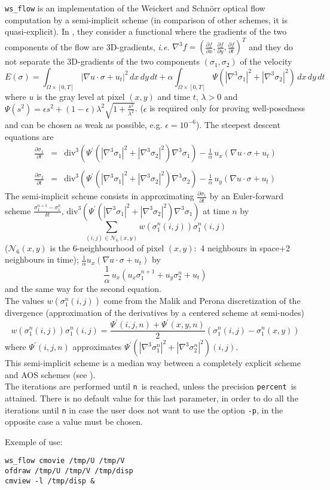 \verb+ws_flow+ is an implementation of the Weickert and Schn\"orr optical flow computation by a semi-implicit scheme (in comparison of other schemes, it is quasi-explicit). In \cite{weickert.schnorr:of}, they consider a functional where the gradients of the two components of the flow are 3D-gradients, \emph{i.e.} $\nabla^{3} f=(\frac{\partial f}{\partial x},\frac{\partial f}{\partial y},\frac{\partial f}{\partial t})^{T}$ and they do not separate the 3D-gradients of the two components $(\sigma_{1},\sigma_{2})$ of the velocity
$$E(\sigma)=\int_{\Omega\times[0,T]}|\nabla u\cdot \sigma+u_{t}|^2\,dx\,dy\,dt+\alpha \int_{\Omega\times[0,T]} \Psi(|\nabla^{3}\sigma_{1}|^2+|\nabla^{3}\sigma_{2}|^2)\,dx\,dy\,dt$$
where $u$ is the gray level at pixel $(x,y)$ and time $t$, $\lambda>0$ and $\Psi(s^2)=\epsilon s^2+(1-\epsilon)\lambda^2\sqrt{1+\frac{s^2}{\lambda^2}}$. ($\epsilon$ is required only for proving well-posedness and can be chosen as weak as possible, e.g. $\epsilon=10^{-6}$). 
The steepest descent equations are
$$\begin{array}{rcl}
\frac{\partial \sigma_{1}}{\partial t} & = & \mathrm{div}^{3}(\Psi^{\prime}(|\nabla^{3}\sigma_{1}|^2+|\nabla^{3}\sigma_{2}|^2)\nabla^{3}\sigma_{1})-\frac{1}{\alpha}\,u_{x}(\nabla u\cdot \sigma+u_{t})\\
& &\\
\frac{\partial \sigma_{2}}{\partial t} & = & \mathrm{div}^{3}(\Psi^{\prime}(|\nabla^{3}\sigma_{1}|^2+|\nabla^{3}\sigma_{2}|^2)\nabla^{3}\sigma_{2})-\frac{1}{\alpha}\,u_{y}(\nabla u\cdot \sigma+u_{t})
\end{array}
$$ 
The semi-implicit scheme consists in approximating $\frac{\partial \sigma_{1}}{\partial t}$ by an Euler-forward scheme $\frac{\sigma_{1}^{n+1}-\sigma_{1}^{n}}{\delta t}$, $\mathrm{div}^{3}(\Psi^{\prime}(|\nabla^{3}\sigma_{1}|^2+|\nabla^{3}\sigma_{2}|^2)\nabla^{3}\sigma_{1})$ at time $n$ by
$$\sum_{(i,j)\in \mathcal{N}_{6}(x,y)} w(\sigma_{1}^{n}(i,j))\sigma_{1}^{n}(i,j)$$ 
($\mathcal{N}_{6}(x,y)$ is the 6-neighbourhood of pixel $(x,y)$:~4 neighbours in space+2 neighbours in time); $\frac{1}{\alpha}u_{x}(\nabla u\cdot \sigma+u_{t})$ by 
$$\frac{1}{\alpha}\,u_{x}(u_{x}\sigma_{1}^{n+1}+u_{y}\sigma_{2}^{n}+u_{t})$$ 
and the same way for the second equation.\\
The values $w(\sigma_{1}^{n}(i,j))$ come from the Malik and Perona discretization of the divergence (approximation of the derivatives by a centered scheme at semi-nodes)
$$w(\sigma_{1}^{n}(i,j))\sigma_{1}^{n}(i,j)=\frac{\Psi^{\prime}(i,j,n)+\Psi^{\prime}(x,y,n)}{2}(\sigma_{1}^{n}(i,j)-\sigma_{1}^{n}(x,y))$$
where $\Psi^{\prime}(i,j,n)$ approximates $\Psi^{\prime}(|\nabla^{3}\sigma_{1}^{n}|^2+|\nabla^{3}\sigma_{2}^{n}|^2)(i,j)$.\\
This semi-implicit scheme is a median way between a completely explicit scheme and AOS schemes (see \cite{weickert.romeny.ea:diffusion}). \\
The iterations are performed until \texttt{n}~is reached, unless the precision \texttt{percent}~is attained. There is no default value for this last parameter, in order to do all the iterations until \texttt{n} in case the user does not want to use the option \texttt{-p}, in the opposite case a value must be chosen.

\medskip

Exemple of use:
\begin{verbatim}
ws_flow cmovie /tmp/U /tmp/V
ofdraw /tmp/U /tmp/V /tmp/disp
cmview -l /tmp/disp &
\end{verbatim}
